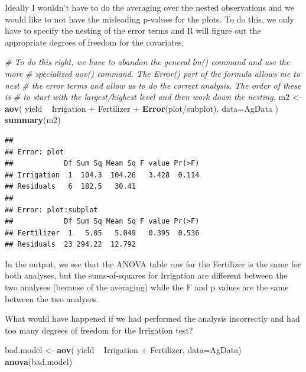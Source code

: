 \documentclass[]{book}
\newenvironment{Shaded}{\begin{snugshade}}{\end{snugshade}}
\newcommand{\KeywordTok}[1]{\textcolor[rgb]{0.13,0.29,0.53}{\textbf{{#1}}}}
\newcommand{\DataTypeTok}[1]{\textcolor[rgb]{0.13,0.29,0.53}{{#1}}}
\newcommand{\StringTok}[1]{\textcolor[rgb]{0.31,0.60,0.02}{{#1}}}
\newcommand{\CommentTok}[1]{\textcolor[rgb]{0.56,0.35,0.01}{\textit{{#1}}}}
\newcommand{\NormalTok}[1]{{#1}}
\theoremstyle{definition}
\theoremstyle{definition}
\theoremstyle{remark}
\begin{document}
Ideally I wouldn't have to do the averaging over the nested observations
and we would like to not have the misleading p-values for the plots. To
do this, we only have to specify the nesting of the error terms and R
will figure out the appropriate degrees of freedom for the covariates.

\begin{Shaded}
\begin{Highlighting}[]
\CommentTok{# To do this right, we have to abandon the general lm() command and use the more}
\CommentTok{# specialized aov() command.  The Error() part of the formula allows me to nest}
\CommentTok{# the error terms and allow us to do the correct analysis. The order of these is}
\CommentTok{# to start with the largest/highest level and then work down the nesting.}
\NormalTok{m2 <-}\StringTok{ }\KeywordTok{aov}\NormalTok{( yield ~}\StringTok{ }\NormalTok{Irrigation +}\StringTok{ }\NormalTok{Fertilizer +}\StringTok{ }\KeywordTok{Error}\NormalTok{(plot/subplot), }\DataTypeTok{data=}\NormalTok{AgData )}
\KeywordTok{summary}\NormalTok{(m2)}
\end{Highlighting}
\end{Shaded}

\begin{verbatim}
## 
## Error: plot
##            Df Sum Sq Mean Sq F value Pr(>F)
## Irrigation  1  104.3  104.26   3.428  0.114
## Residuals   6  182.5   30.41               
## 
## Error: plot:subplot
##            Df Sum Sq Mean Sq F value Pr(>F)
## Fertilizer  1   5.05   5.049   0.395  0.536
## Residuals  23 294.22  12.792
\end{verbatim}

In the output, we see that the ANOVA table row for the Fertilizer is the
same for both analyses, but the sums-of-squares for Irrigation are
different between the two analyses (because of the averaging) while the
F and p values are the same between the two analyses.

What would have happened if we had performed the analysis incorrectly
and had too many degrees of freedom for the Irrigation test?

\begin{Shaded}
\begin{Highlighting}[]
\NormalTok{bad.model <-}\StringTok{ }\KeywordTok{aov}\NormalTok{( yield ~}\StringTok{ }\NormalTok{Irrigation +}\StringTok{ }\NormalTok{Fertilizer, }\DataTypeTok{data=}\NormalTok{AgData)}
\KeywordTok{anova}\NormalTok{(bad.model)}
\end{Highlighting}
\end{Shaded}
\end{document}
